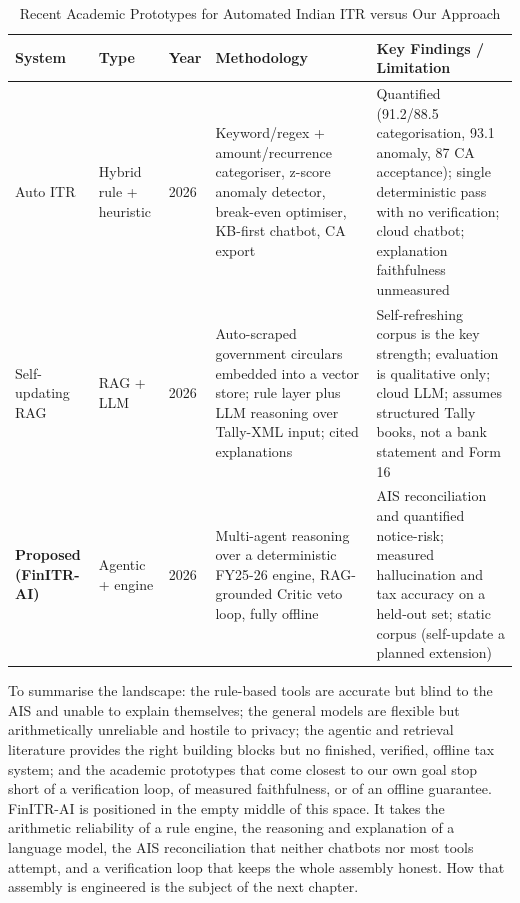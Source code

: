\begin{table}[H]
\centering
\caption{Recent Academic Prototypes for Automated Indian ITR versus Our Approach}
\label{tab:cat-d-comparison}
\small
\begin{tabularx}{\textwidth}{|l|l|l|X|X|}
\hline
\textbf{System} & \textbf{Type} & \textbf{Year} & \textbf{Methodology} & \textbf{Key Findings / Limitation} \\
\hline
Auto ITR \cite{ref13} & Hybrid rule + heuristic & 2026 & Keyword/regex + amount/recurrence categoriser, z-score anomaly detector, break-even optimiser, KB-first chatbot, CA export & Quantified (91.2/88.5 categorisation, 93.1 anomaly, 87 CA acceptance); single deterministic pass with no verification; cloud chatbot; explanation faithfulness unmeasured \\
\hline
Self-updating RAG \cite{ref14} & RAG + LLM & 2026 & Auto-scraped government circulars embedded into a vector store; rule layer plus LLM reasoning over Tally-XML input; cited explanations & Self-refreshing corpus is the key strength; evaluation is qualitative only; cloud LLM; assumes structured Tally books, not a bank statement and Form 16 \\
\hline
\textbf{Proposed (FinITR-AI)} & Agentic + engine & 2026 & Multi-agent reasoning over a deterministic FY25-26 engine, RAG-grounded Critic veto loop, fully offline & AIS reconciliation and quantified notice-risk; measured hallucination and tax accuracy on a held-out set; static corpus (self-update a planned extension) \\
\hline
\end{tabularx}
\end{table}

To summarise the landscape: the rule-based tools are accurate but blind to the
AIS and unable to explain themselves; the general models are flexible but
arithmetically unreliable and hostile to privacy; the agentic and retrieval
literature provides the right building blocks but no finished, verified, offline
tax system; and the academic prototypes that come closest to our own goal stop
short of a verification loop, of measured faithfulness, or of an offline
guarantee. FinITR-AI is positioned in the empty middle of this space. It takes
the arithmetic reliability of a rule engine, the reasoning and explanation of a
language model, the AIS reconciliation that neither chatbots nor most tools
attempt, and a verification loop that keeps the whole assembly honest. How that
assembly is engineered is the subject of the next chapter.
